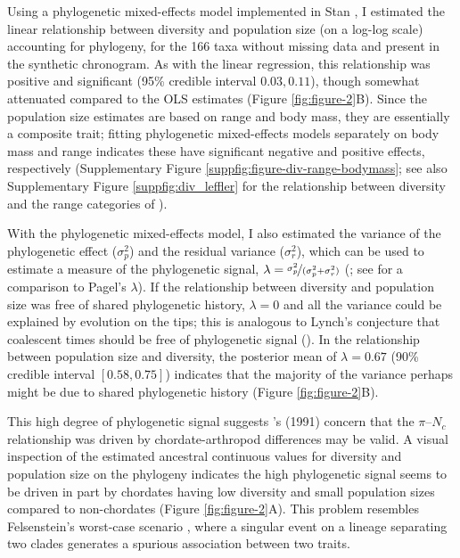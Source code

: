 \documentclass[11pt]{article}
\begin{document}
Using a phylogenetic mixed-effects model
\parencite{Lynch1991-tp,Hadfield2010-ql,De_Villemereuil2014-kt} implemented in
Stan \parencite{Carpenter2017-xi,Stan_Development_Team2020-ea}, I estimated the
linear relationship between diversity and population size (on a log-log scale)
accounting for phylogeny, for the 166 taxa without missing data and present in
the synthetic chronogram. As with the linear regression, this relationship was
positive and significant (95\% credible interval $0.03, 0.11$), though somewhat
attenuated compared to the OLS estimates (Figure \ref{fig:figure-2}B). Since
the population size estimates are based on range and body mass, they are
essentially a composite trait; fitting phylogenetic mixed-effects models
separately on body mass and range indicates these have significant negative and
positive effects, respectively (Supplementary Figure
\ref{suppfig:figure-div-range-bodymass}; see also Supplementary Figure
\ref{suppfig:div_leffler} for the relationship between diversity and the range
categories of \cite{Leffler2012-zj}).

With the phylogenetic mixed-effects model, I also estimated the variance of the
phylogenetic effect ($\sigma_p^2$) and the residual variance ($\sigma_r^2$),
which can be used to estimate a measure of the phylogenetic signal, $\lambda =
\nicefrac{\sigma_p^2}{(\sigma_p^2 + \sigma_r^2)}$
(\cite{Lynch1991-tp,De_Villemereuil2014-kt}; see \cite{Freckleton2002-ly} for a
comparison to Pagel's $\lambda$).  If the relationship between diversity and
population size was free of shared phylogenetic history, $\lambda = 0$ and all
the variance could be explained by evolution on the tips; this is analogous to
Lynch's conjecture that coalescent times should be free of phylogenetic signal
(\citeyear{Lynch2011-qv}). In the relationship between population size and
diversity, the posterior mean of $\lambda = 0.67$ (90\% credible interval
$[0.58, 0.75]$) indicates that the majority of the variance perhaps might be
due to shared phylogenetic history (Figure \ref{fig:figure-2}B).

This high degree of phylogenetic signal suggests
\citeauthor{Gillespie1991-qa}'s (1991) concern that the $\pi$--$N_c$
relationship was driven by chordate-arthropod differences may be valid. A
visual inspection of the estimated ancestral continuous values for diversity
and population size on the phylogeny indicates the high phylogenetic signal
seems to be driven in part by chordates having low diversity and small
population sizes compared to non-chordates (Figure \ref{fig:figure-2}A). This
problem resembles Felsenstein's worst-case scenario
\parencite{Felsenstein1985-an,Uyeda2018-wf}, where a singular event on a
lineage separating two clades generates a spurious association between two
traits. 
\end{document}
